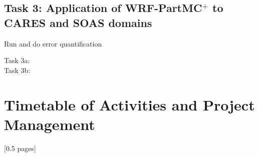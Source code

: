 \documentclass[11pt]{article}
\begin{document}
\subsection{Task 3: Application of WRF-PartMC$^+$ to CARES and SOAS domains}
Run and do error quantification
\begin{description}
\item[Task 3a:]
\item[Task 3b:]
\end{description}



\section{Timetable of Activities and Project Management}
[0.5 pages]

 
\end{document}
